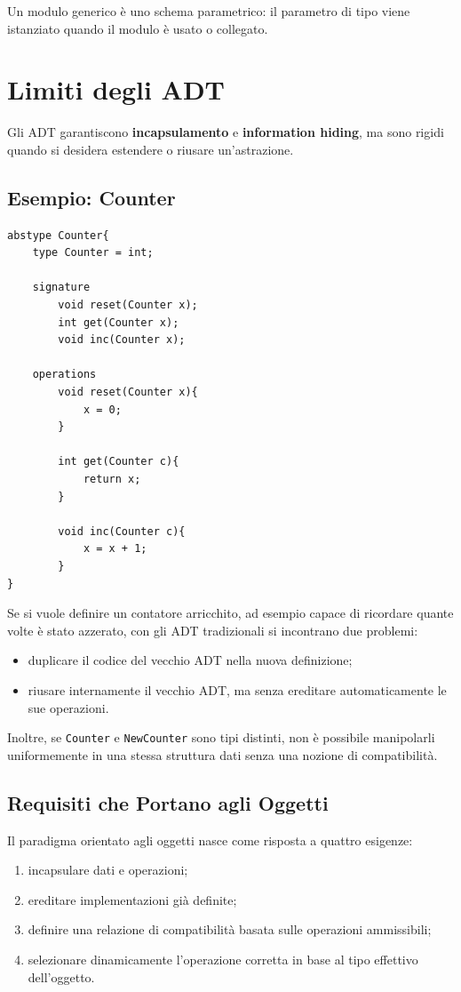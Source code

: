 \documentclass{article}
\begin{document}
Un modulo generico è uno schema parametrico: il parametro di tipo viene istanziato quando il modulo è usato o collegato.

\section{Limiti degli ADT}

Gli ADT garantiscono \textbf{incapsulamento} e \textbf{information hiding}, ma sono rigidi quando si desidera estendere o riusare un'astrazione.

\subsection{Esempio: Counter}

\begin{lstlisting}
abstype Counter{
    type Counter = int;

    signature
        void reset(Counter x);
        int get(Counter x);
        void inc(Counter x);

    operations
        void reset(Counter x){
            x = 0;
        }

        int get(Counter c){
            return x;
        }

        void inc(Counter c){
            x = x + 1;
        }
}
\end{lstlisting}

Se si vuole definire un contatore arricchito, ad esempio capace di ricordare quante volte è stato azzerato, con gli ADT tradizionali si incontrano due problemi:
\begin{itemize}
  \item duplicare il codice del vecchio ADT nella nuova definizione;
  \item riusare internamente il vecchio ADT, ma senza ereditare automaticamente le sue operazioni.
\end{itemize}

Inoltre, se \texttt{Counter} e \texttt{NewCounter} sono tipi distinti, non è possibile manipolarli uniformemente in una stessa struttura dati senza una nozione di compatibilità.

\subsection{Requisiti che Portano agli Oggetti}

Il paradigma orientato agli oggetti nasce come risposta a quattro esigenze:
\begin{enumerate}
  \item incapsulare dati e operazioni;
  \item ereditare implementazioni già definite;
  \item definire una relazione di compatibilità basata sulle operazioni ammissibili;
  \item selezionare dinamicamente l'operazione corretta in base al tipo effettivo dell'oggetto.
\end{enumerate}
\end{document}
